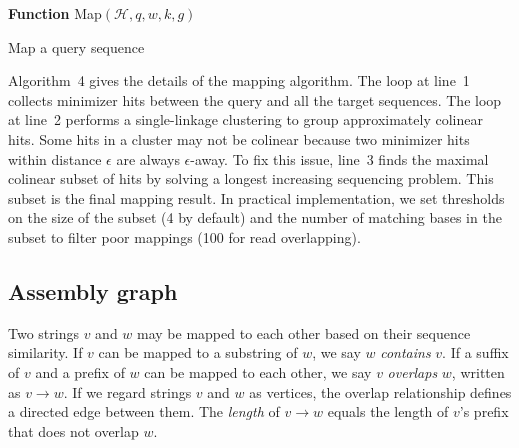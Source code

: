 \documentclass{bioinfo}
\begin{document}
\begin{methods}
\begin{algorithm}[tb]
\DontPrintSemicolon
\footnotesize
{}
\BlankLine
\textbf{Function} {\sc Map}$(\mathcal{H},q,w,k,g)$
\caption{Map a query sequence}
\end{algorithm}

Algorithm~4 gives the details of the mapping algorithm. The loop at line~1
collects minimizer hits between the query and all the target sequences. The
loop at line~2 performs a single-linkage clustering to group approximately
colinear hits. Some hits in a cluster may not be colinear because two minimizer
hits within distance $\epsilon$ are always $\epsilon$-away. To fix this issue,
line~3 finds the maximal colinear subset of hits by solving a longest
increasing sequencing problem. This subset is the final mapping result. In
practical implementation, we set thresholds on the size of the subset (4 by default) and the
number of matching bases in the subset to filter poor mappings (100 for read overlapping).

\subsection{Assembly graph}

Two strings $v$ and $w$ may be mapped to each other based on their sequence
similarity. If $v$ can be mapped to a substring of $w$, we say $w$
\emph{contains} $v$. If a suffix of $v$ and a prefix of $w$ can be mapped to
each other, we say $v$ \emph{overlaps} $w$, written as $v\to w$.
If we regard strings $v$ and $w$ as vertices, the overlap relationship defines
a directed edge between them. The \emph{length} of $v\to w$ equals the length
of $v$'s prefix that does not overlap $w$.


\end{methods}
\end{document}
